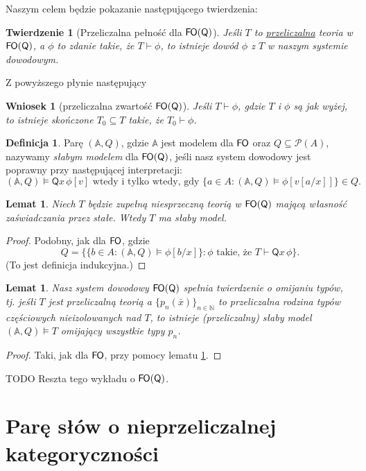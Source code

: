 \documentclass{article}
\newcommand{\N}{\mathbb{N}}
\newcommand{\A}{\mathbb{A}}
\theoremstyle{plain}
\newtheorem{tw}[thm]{Twierdzenie}
\newtheorem{wn}[thm]{Wniosek}
\newtheorem{lem}[thm]{Lemat}
\theoremstyle{definition}
\newtheorem{df}[thm]{Definicja}
\theoremstyle{remark}
\newcommand{\FO}{\mathsf{F \mkern-1.4mu O}}
\newcommand{\q}{\mathsf{Q}}
\begin{document}
Naszym celem będzie pokazanie następującego twierdzenia:
\begin{tw}[Przeliczalna pełność dla $\FO(\q)$]
	Jeśli $T$ to \underline{przeliczalna} teoria w $\FO(\q)$, a $\phi$ to zdanie takie, że $T \vdash \phi$,
	to istnieje dowód $\phi$ z $T$ w naszym systemie dowodowym.
\end{tw}
Z powyższego płynie następujący
\begin{wn}[przeliczalna zwartość $\FO(\q)$]
	 Jeśli $T \vdash \phi$, gdzie $T$ i $\phi$ są jak wyżej, to istnieje skończone $T_0 \subseteq T$ takie, że $T_0 \vdash \phi$.
\end{wn}

\begin{df}
	Parę $(\A, Q)$, gdzie $\A$ jest modelem dla $\FO$ oraz $Q \subseteq \mathcal{P}(A)$, nazywamy \textit{słabym modelem} dla $\FO(\q)$,
	jeśli nasz system dowodowy jest poprawny przy następującej interpretacji:
	\[
		(\A, Q) \models \q x \, \phi[v] \text{ wtedy i tylko wtedy, gdy } \{a \in A \colon (\A, Q) \models \phi[v[a/x]]\} \in Q.
	\]

\end{df}

\begin{lem}
\label{lem:slaby_model}
	Niech $T$ będzie zupełną niesprzeczną teorią w $\FO(\q)$ mającą własność zaświadczania przez stałe.
	Wtedy $T$ ma słaby model.
\end{lem}
\begin{proof}
	 Podobny, jak dla $\FO$, gdzie
	 \[
		 Q = \{\{ b \in A \colon (\A, Q) \models \phi[b/x]\} \colon \phi \text{ takie, że } T \vdash \q x \, \phi \}.
	 \]
	 (To jest definicja indukcyjna.)
\end{proof}

\begin{lem}
	Nasz system dowodowy $\FO(\q)$ spełnia twierdzenie o omijaniu typów,
	tj. jeśłi $T$ jest przeliczalną teorią a $\{p_n(\bar{x})\}_{n \in \N}$ to przeliczalna rodzina typów częściowych nieizolowanych nad $T$,
	to istnieje (przeliczalny) słaby model $(\A, Q) \models T$ omijający wszystkie typy $p_n$.
\end{lem}
\begin{proof}
	Taki, jak dla $\FO$, przy pomocy lematu \ref{lem:slaby_model}.
\end{proof}

TODO Reszta tego wykładu o $\FO(\mathsf{Q})$.


\section{Parę słów o nieprzeliczalnej kategoryczności}
\end{document}
